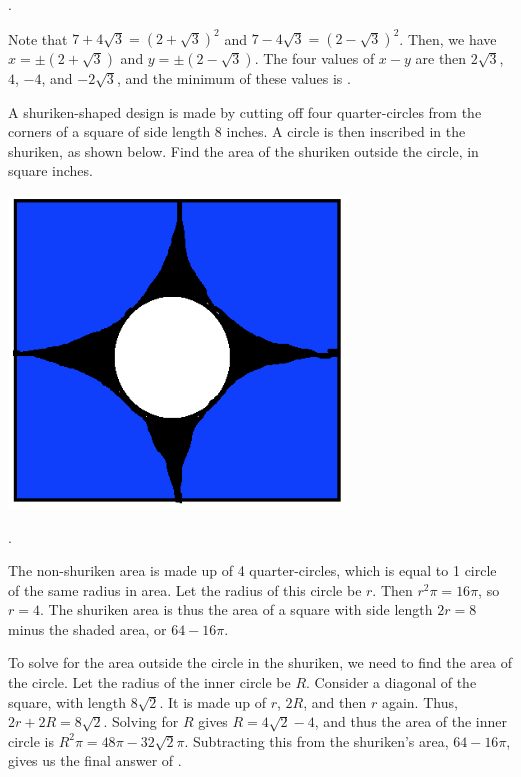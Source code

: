 \documentclass[11pt]{article}
\begin{document}
\begin{answer}
.
\end{answer}

\begin{solution}
Note that $7 + 4\sqrt{3} = (2 + \sqrt{3})^2$ and $7 - 4\sqrt{3} = (2 - \sqrt{3})^2$. Then, we have $x = \pm(2 + \sqrt{3})$ and $y = \pm(2 - \sqrt{3})$. The four values of $x-y$ are then $2\sqrt{3}$, $4$, $-4$, and $-2\sqrt{3}$, and the minimum of these values is .
\end{solution}

\begin{problem}
A shuriken-shaped design is made by cutting off four quarter-circles from the corners of a square of side length 8 inches. A circle is then inscribed in the shuriken, as shown below. Find the area of the shuriken outside the circle, in square inches.
\begin{center}
\includegraphics[width=9cm]{shuriken.png}
\end{center}
\end{problem}

\begin{answer}
.
\end{answer}

\begin{solution}
The non-shuriken area is made up of 4 quarter-circles, which is equal to 1 circle of the same radius in area. Let the radius of this circle be $r$. Then $r^{2}\pi = 16\pi$, so $r = 4$. The shuriken area is thus the area of a square with side length $2r = 8$ minus the shaded area, or $64 - 16\pi$.

To solve for the area outside the circle in the shuriken, we need to find the area of the circle. Let the radius of the inner circle be $R$. Consider a diagonal of the square, with length $8\sqrt{2}$. It is made up of $r$, $2R$, and then $r$ again. Thus, $2r + 2R = 8\sqrt{2}$. Solving for $R$ gives $R = 4\sqrt{2} - 4$, and thus the area of the inner circle is $R^2\pi = 48\pi - 32\sqrt{2}\pi$. Subtracting this from the shuriken's area, $64 - 16\pi$, gives us the final answer of .
\end{solution}
\end{document}
